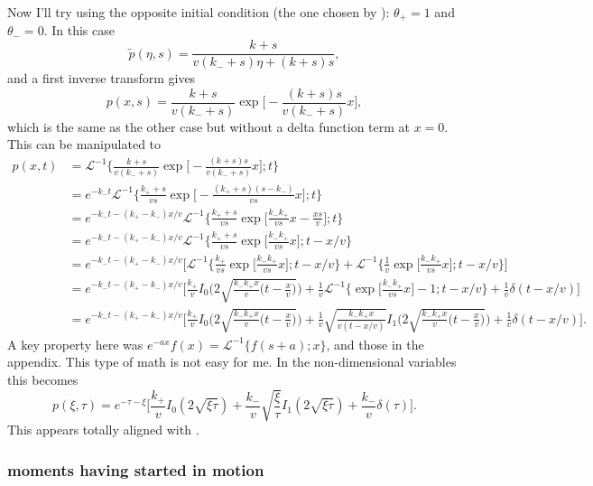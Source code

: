 \documentclass[11pt]{article}
\newcommand\be{\begin{equation}} %
\newcommand\ee{\end{equation}}   %
\newcommand\El{\mathcal{L}}
\begin{document}
Now I'll try using the opposite initial condition (the one chosen by \citet{Lisle1998}): $\theta_+ = 1$ and $\theta_- = 0$.
In this case
\be \tilde{p}(\eta,s) = \frac{k+s}{v(k_-+s)\eta + (k+s)s},\ee
and a first inverse transform gives
\be p(x,s) = \frac{k+s}{v(k_-+s)} \exp\Big[-\frac{(k+s)s}{v(k_-+s)}x\Big],\ee
which is the same as the other case but without a delta function term at $x=0$.
This can be manipulated to 
\begin{align} p(x,t) &= \El^{-1} \Big\{ \frac{k+s}{v(k_-+s)} \exp\Big[-\frac{(k+s)s}{v(k_-+s)}x\Big] ; t\Big\} \\
&=  e^{-k_- t}\El^{-1} \Big\{ \frac{k_++s}{vs} \exp\Big[-\frac{(k_++s)(s-k_-)}{vs}x\Big] ; t\Big\} \\
&= e^{-k_- t -(k_+-k_-)x/v}\El^{-1} \Big\{ \frac{k_++s}{vs} \exp\Big[\frac{k_-k_+}{vs}x - \frac{xs}{v}\Big] ; t\Big\}\\
&= e^{-k_- t -(k_+-k_-)x/v}\El^{-1} \Big\{ \frac{k_++s}{vs} \exp\Big[\frac{k_-k_+}{vs}x\Big] ; t-x/v\Big\} \\
&=  e^{-k_- t -(k_+-k_-)x/v} \Big[ \El^{-1}  \Big\{ \frac{k_+}{vs} \exp\Big[\frac{k_-k_+}{vs}x\Big];t-x/v \Big\} + \El^{-1}  \Big\{ \frac{1}{v} \exp\Big[\frac{k_-k_+}{vs}x\Big];t-x/v \Big\} \Big] \\
&=  e^{-k_- t -(k_+-k_-)x/v} \Big[\frac{k_+}{v} I_0\Big(2\sqrt{\frac{k_-k_+ x}{v}\big(t-\frac{x}{v}\big)}\Big) + \frac{1}{v}\El^{-1}\Big\{  \exp\Big[\frac{k_-k_+}{vs}x\Big] -1;t-x/v \Big\} + \frac{1}{v}\delta(t-x/v) \Big] \\ 
&=  e^{-k_- t -(k_+-k_-)x/v} \Big[\frac{k_+}{v} I_0\Big(2\sqrt{\frac{k_-k_+ x}{v}\big(t-\frac{x}{v}\big)}\Big) + \frac{1}{v}\sqrt{\frac{k_- k_+ x}{v (t-x/v)}}I_1\Big(2\sqrt{\frac{k_-k_+ x}{v}\big(t-\frac{x}{v}\big)}\Big) + \frac{1}{v}\delta(t-x/v) \Big].
\end{align}
A key property here was $e^{-ax}f(x) = \El^{-1}\{f(s+a);x\}$, and those in the appendix.
This type of math is not easy for me.
In the non-dimensional variables this becomes
\be p(\xi,\tau) = e^{-\tau-\xi}\Big[ \frac{k_+}{v} I_0(2\sqrt{\xi\tau}) + \frac{k_-}{v}\sqrt{\frac{\xi}{\tau}}I_1(2\sqrt{\xi\tau}) + \frac{k_-}{v} \delta(\tau)\Big].\ee
This appears totally aligned with \citet{Lisle1998}.
\subsubsection{moments having started in motion}
\end{document}
